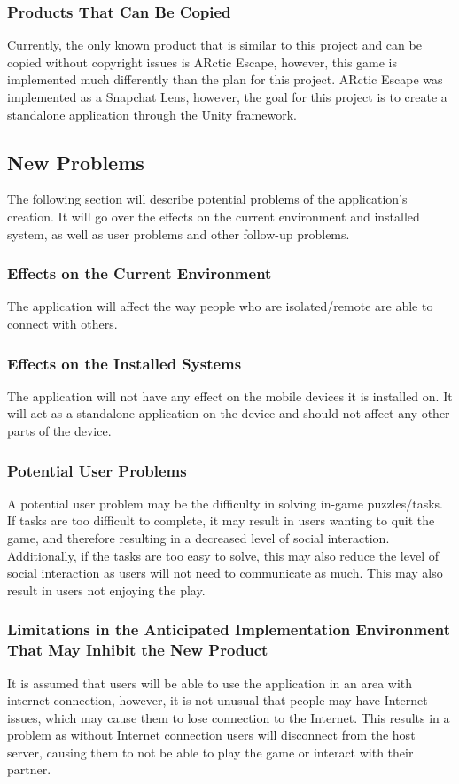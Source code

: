 \documentclass[12pt]{article}
\begin{document}
\subsubsection{Products That Can Be Copied}
Currently, the only known product that is similar to this project and can be copied without copyright issues is ARctic Escape, however, this game is implemented much differently than the plan for this project. ARctic Escape was implemented as a Snapchat Lens, however, the goal for this project is to create a standalone application through the Unity framework.

\subsection{New Problems}
The following section will describe potential problems of the application's creation. It will go over the effects on the current environment and installed system, as well as user problems and other follow-up problems.

\subsubsection{Effects on the Current Environment}
The application will affect the way people who are isolated/remote are able to connect with others.

\subsubsection{Effects on the Installed Systems}
The application will not have any effect on the mobile devices it is installed on. It will act as a standalone application on the device and should not affect any other parts of the device.

\subsubsection{Potential User Problems}
A potential user problem may be the difficulty in solving in-game puzzles/tasks. If tasks are too difficult to complete, it may result in users wanting to quit the game, and therefore resulting in a decreased level of social interaction. Additionally, if the tasks are too easy to solve, this may also reduce the level of social interaction as users will not need to communicate as much. This may also result in users not enjoying the play.

\subsubsection{Limitations in the Anticipated Implementation Environment That May Inhibit the New Product}
It is assumed that users will be able to use the application in an area with internet connection, however, it is not unusual that people may have Internet issues, which may cause them to lose connection to the Internet. This results in a problem as without Internet connection users will disconnect from the host server, causing them to not be able to play the game or interact with their partner.
\end{document}
